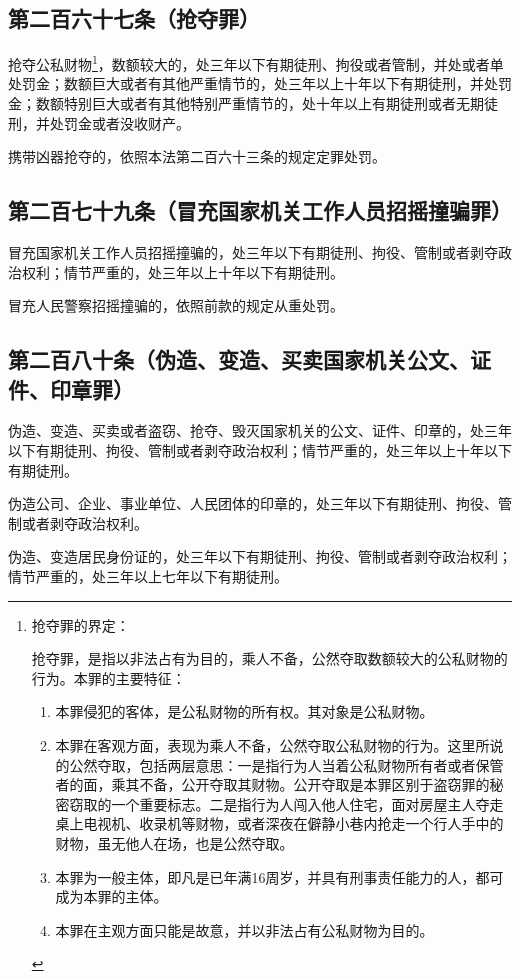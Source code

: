 \documentclass[utf-8,10pt]{ctexart}
\begin{document}
\subsection{第二百六十七条（抢夺罪）}
抢夺公私财物\footnote{
抢夺罪的界定：

抢夺罪，是指以非法占有为目的，乘人不备，公然夺取数额较大的公私财物的行为。本罪的主要特征：
\begin{enumerate}
\item 本罪侵犯的客体，是公私财物的所有权。其对象是公私财物。
\item 本罪在客观方面，表现为乘人不备，公然夺取公私财物的行为。这里所说的公然夺取，包括两层意思：一是指行为人当着公私财物所有者或者保管者的面，乘其不备，公开夺取其财物。公开夺取是本罪区别于盗窃罪的秘密窃取的一个重要标志。二是指行为人闯入他人住宅，面对房屋主人夺走桌上电视机、收录机等财物，或者深夜在僻静小巷内抢走一个行人手中的财物，虽无他人在场，也是公然夺取。
\item 本罪为一般主体，即凡是已年满16周岁，并具有刑事责任能力的人，都可成为本罪的主体。
\item 本罪在主观方面只能是故意，并以非法占有公私财物为目的。
\end{enumerate}
}，数额较大的，处三年以下有期徒刑、拘役或者管制，并处或者单处罚金；数额巨大或者有其他严重情节的，处三年以上十年以下有期徒刑，并处罚金；数额特别巨大或者有其他特别严重情节的，处十年以上有期徒刑或者无期徒刑，并处罚金或者没收财产。

携带凶器抢夺的，依照本法第二百六十三条的规定定罪处罚。
\subsection{第二百七十九条（冒充国家机关工作人员招摇撞骗罪）}
冒充国家机关工作人员招摇撞骗的，处三年以下有期徒刑、拘役、管制或者剥夺政治权利；情节严重的，处三年以上十年以下有期徒刑。

冒充人民警察招摇撞骗的，依照前款的规定从重处罚。
\subsection{第二百八十条（伪造、变造、买卖国家机关公文、证件、印章罪）}

伪造、变造、买卖或者盗窃、抢夺、毁灭国家机关的公文、证件、印章的，处三年以下有期徒刑、拘役、管制或者剥夺政治权利；情节严重的，处三年以上十年以下有期徒刑。

伪造公司、企业、事业单位、人民团体的印章的，处三年以下有期徒刑、拘役、管制或者剥夺政治权利。

伪造、变造居民身份证的，处三年以下有期徒刑、拘役、管制或者剥夺政治权利；情节严重的，处三年以上七年以下有期徒刑。
\end{document}
